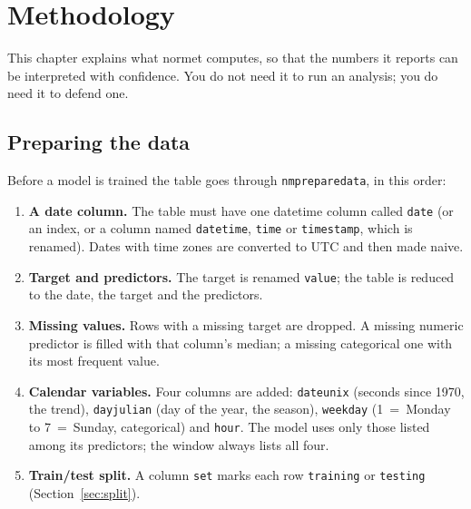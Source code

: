 \documentclass[11pt]{report}
\newcommand{\nosep}{\setlength{\itemsep}{0pt}\setlength{\parskip}{0pt}\setlength{\topsep}{2pt}}
\newcommand{\nm}{\textsf{normet}}
\newcommand{\codeunderscore}{\textunderscore\allowbreak}
\newcommand{\code}[1]{\texttt{\let\_\codeunderscore #1}}
\begin{document}
\chapter{Methodology}\label{ch:theory}

This chapter explains what \nm{} computes, so that the numbers it reports can be
interpreted with confidence. You do not need it to run an analysis; you do need it to
defend one.

\section{Preparing the data}\label{sec:prepare}
Before a model is trained the table goes through \code{nm\_prepare\_data}, in this order:
\begin{enumerate}\nosep
  \item \textbf{A date column.} The table must have one datetime column called
        \code{date} (or an index, or a column named \code{datetime}, \code{time} or
        \code{timestamp}, which is renamed). Dates with time zones are converted to UTC
        and then made naive.
  \item \textbf{Target and predictors.} The target is renamed \code{value}; the table is
        reduced to the date, the target and the predictors.
  \item \textbf{Missing values.} Rows with a missing target are dropped. A missing
        numeric predictor is filled with that column's median; a missing categorical
        one with its most frequent value.
  \item \textbf{Calendar variables.} Four columns are added: \code{date\_unix} (seconds
        since 1970, the trend), \code{day\_julian} (day of the year, the season),
        \code{weekday} (1~=~Monday to 7~=~Sunday, categorical) and \code{hour}.
        The model uses only those listed among its predictors; the window always lists
        all four.
  \item \textbf{Train/test split.} A column \code{set} marks each row
        \code{training} or \code{testing} (Section~\ref{sec:split}).
\end{enumerate}
\end{document}
